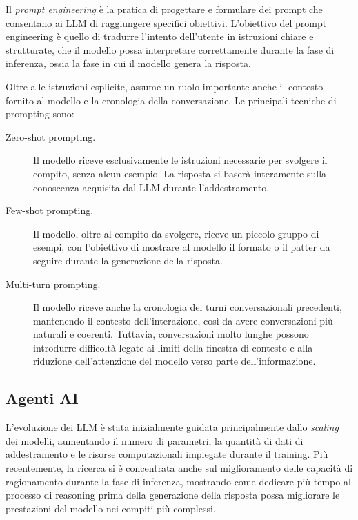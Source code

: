 Il \textit{prompt engineering} è la pratica di progettare e formulare dei prompt che consentano ai LLM di raggiungere specifici obiettivi. L'obiettivo del prompt engineering è quello di tradurre l'intento dell'utente in istruzioni chiare e strutturate, che il modello possa interpretare correttamente durante la fase di inferenza, ossia la fase in cui il modello genera la risposta. \cite{dhamani2026genai} %

Oltre alle istruzioni esplicite, assume un ruolo importante anche il contesto fornito al modello e la cronologia della conversazione. Le principali tecniche di prompting sono:

\begin{description}
    \item[Zero-shot prompting.] Il modello riceve esclusivamente le istruzioni necessarie per svolgere il compito, senza alcun esempio. La risposta si baserà interamente sulla conoscenza acquisita dal LLM durante l'addestramento.
    \item[Few-shot prompting.] Il modello, oltre al compito da svolgere, riceve un piccolo gruppo di esempi, con l'obiettivo di mostrare al modello il formato o il patter da seguire durante la generazione della risposta.
    \item[Multi-turn prompting.] Il modello riceve anche la cronologia dei turni conversazionali precedenti, mantenendo il contesto dell'interazione, così da avere conversazioni più naturali e coerenti. Tuttavia, conversazioni molto lunghe possono introdurre difficoltà legate ai limiti della finestra di contesto e alla riduzione dell'attenzione del modello verso parte dell'informazione.
\end{description}

\cite{dhamani2026genai} %

\subsection{Agenti AI} %

L'evoluzione dei LLM è stata inizialmente guidata principalmente dallo \textit{scaling} dei modelli, aumentando il numero di parametri, la quantità di dati di addestramento e le risorse computazionali impiegate durante il training. Più recentemente, la ricerca si è concentrata anche sul miglioramento delle capacità di ragionamento durante la fase di inferenza, mostrando come dedicare più tempo al processo di reasoning prima della generazione della risposta possa migliorare le prestazioni del modello nei compiti più complessi.

